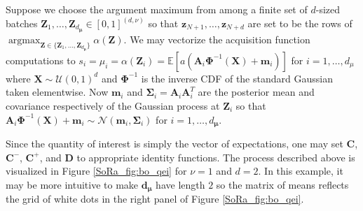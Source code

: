 \documentclass[graybox]{svmult}
\begin{document}
Suppose we choose the argument maximum  from among a finite set of $d$-sized batches $\boldsymbol{Z}_1,\dots,\boldsymbol{Z}_{d_{\boldsymbol{\mu}}} \in [0,1]^{(d,\nu)}$ so that $\boldsymbol{z}_{N+1}, \dots,\boldsymbol{z}_{N+d}$ are set to be the rows of $\mathop{\text{argmax}}_{\boldsymbol{Z} \in \{\boldsymbol{Z}_1,\dots,\boldsymbol{Z}_{d_{\boldsymbol{\mu}}}\}}\alpha(\boldsymbol{Z})$. We may vectorize the acquisition function computations to $s_i = \mu_i = \alpha(\boldsymbol{Z}_i) = \mathbb{E}\left[a\left(\boldsymbol{A}_i\boldsymbol{\Phi}^{-1}(\boldsymbol{X})+\boldsymbol{m}_i\right)\right]$ for $i=1,\dots,d_\mu$ where $\boldsymbol{X} \sim \mathcal{U}(0,1)^d$ and $\boldsymbol{\Phi}^{-1}$ is the inverse CDF of the standard Gaussian taken elementwise. Now $\boldsymbol{m}_i$ and $\boldsymbol{\Sigma}_i = \boldsymbol{A}_i\boldsymbol{A}_i^T$ are the posterior mean and covariance respectively of the Gaussian process at $\boldsymbol{Z}_i$ so that $\boldsymbol{A}_i\boldsymbol{\Phi}^{-1}(\boldsymbol{X})+\boldsymbol{m}_i \sim \mathcal{N}\left(\boldsymbol{m}_i,\boldsymbol{\Sigma}_i\right)$ for $i=1,\dots,d_{\boldsymbol{\mu}}$.

Since the quantity of interest is simply the vector of expectations, one may set $\boldsymbol{C}$, $\boldsymbol{C}^-$, $\boldsymbol{C}^+$, and $\boldsymbol{D}$ to appropriate identity functions. The process described above is visualized in Figure \ref{SoRa_fig:bo_qei} for $\nu=1$ and $d=2$. In this example, it may be more intuitive to make $\boldsymbol{d}_{\boldsymbol{\mu}}$ have length $2$ so the matrix of means reflects the grid of white dots in the right panel of Figure \ref{SoRa_fig:bo_qei}. 

\end{document}
